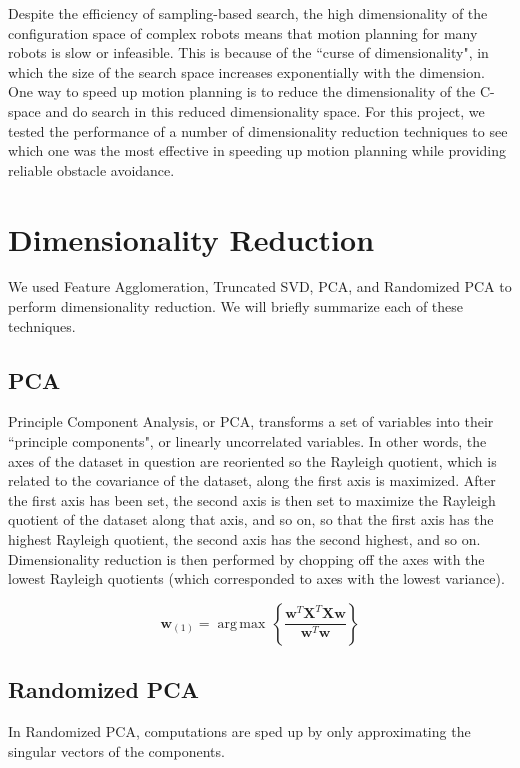 \documentclass[12pt]{article}
\begin{document}
Despite the efficiency of sampling-based search, the high dimensionality of the
configuration space of complex robots means that motion planning for many
robots is slow or infeasible. This is because of the ``curse of dimensionality",
in which the size of the search space increases exponentially with the
dimension. One way to speed up motion planning is to reduce the dimensionality
of the C-space and do search in this reduced dimensionality space. For this
project, we tested the performance of a number of dimensionality reduction
techniques to see which one was the most effective in speeding up motion
planning while providing reliable obstacle avoidance.

\section{Dimensionality Reduction}

We used Feature Agglomeration, Truncated SVD, PCA, and Randomized PCA to perform dimensionality reduction. We will briefly summarize each of these techniques.

\subsection{PCA} Principle Component Analysis, or PCA, transforms a set of variables into 
their ``principle components", or linearly uncorrelated variables. In other words, the axes of the dataset in question are reoriented so the Rayleigh quotient, which is related to the covariance of the dataset, along the first axis is maximized. After the first axis has been set, the second axis is then set to maximize the Rayleigh quotient of the dataset along that axis, and so on, so that the first axis has the highest Rayleigh quotient, the second axis has the second highest, and so on. Dimensionality reduction is then performed by chopping off the axes with the lowest Rayleigh quotients (which corresponded to axes with the lowest variance).

$$
\mathbf{w}_{(1)} = {\operatorname{\arg\,max}}\, \left\{ \frac{\mathbf{w}^T\mathbf{X}^T \mathbf{X w}}{\mathbf{w}^T \mathbf{w}} \right\}
$$


\subsection{Randomized PCA} In Randomized PCA, computations are sped up by only approximating the singular vectors of the components.
\end{document}

